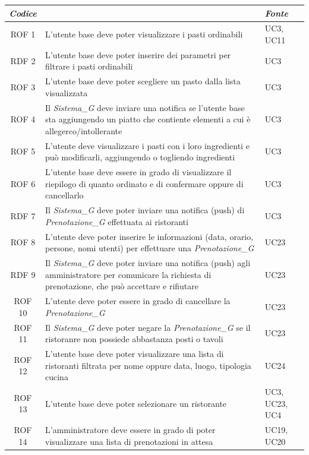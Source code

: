 \documentclass[12pt, oneside]{article}
\begin{document}
\begin{longtable}{|c|p{14cm}|p{2cm}|}
    \hline
    \emph{Codice} & \centering{\emph{Descrizione}} &  \emph{Fonte} \\
    \hline
    \endfirsthead
    \endhead
    ROF 1 & L'utente base deve poter visualizzare i pasti ordinabili & UC3, UC11\\
    \hline
    RDF 2 & L'utente base deve poter inserire dei parametri per filtrare i pasti ordinabili  & UC3 \\
    \hline
    ROF 3 & L'utente base deve poter scegliere un pasto dalla lista visualizzata & UC3 \\
    \hline
    ROF 4 & Il \textit{Sistema_G} deve inviare una notifica se l'utente base sta aggiungendo un piatto che contiente elementi a cui è allegerco/intollerante & UC3\\
    \hline
    ROF 5 & L'utente deve visualizzare i pasti con i loro ingredienti e può modificarli, aggiungendo o togliendo ingredienti & UC3\\
    \hline
    ROF 6 & L'utente base deve essere in grado di visualizzare il riepilogo di quanto ordinato e di confermare oppure di cancellarlo & UC3 \\
    \hline
    RDF 7 & Il \textit{Sistema_G} deve poter inviare una notifica (push) di \textit{Prenotazione_G} effettuata ai ristoranti& UC3 \\
    \hline
    ROF 8 & L'utente deve poter inserire le informazioni (data, orario, persone, nomi utenti) per effettuare una \textit{Prenotazione_G} & UC23\\
    \hline
    RDF 9 & Il \textit{Sistema_G} deve poter inviare una notifica (push) agli amministratore per comunicare la richiesta di prenotazione, che può accettare e rifiutare & UC23\\
    \hline
    ROF 10 & L'utente deve poter essere in grado di cancellare la \textit{Prenotazione_G} & UC23 \\
    \hline
    ROF 11 & Il \textit{Sistema_G} deve poter negare la \textit{Prenotazione_G} se il ristoranre non possiede abbastanza posti o tavoli & UC23 \\
    \hline
    ROF 12 & L'utente base deve poter visualizzare una lista di ristoranti filtrata per nome oppure data, luogo, tipologia cucina & UC24 \\
    \hline
    ROF 13 & L'utente base deve poter selezionare un ristorante  & UC3, UC23, UC4\\
    \hline
    ROF 14 & L'amministratore deve essere in grado di poter visualizzare una lista di prenotazioni in attesa & UC19, UC20 \\

\end{longtable}
\end{document}
